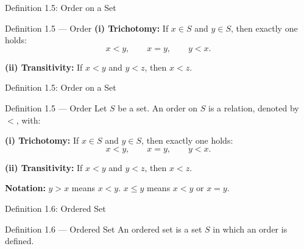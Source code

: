 \documentclass[aspectratio=169,12pt,t]{beamer}
\begin{document}
{\begin{frame}{Definition 1.5: Order on a Set}
\begin{defblock}{Definition 1.5 --- Order}
    \vspace{0.3em}
    \textbf{(i) Trichotomy:} If $x \in S$ and $y \in S$, then exactly one holds:
    \[
      x < y, \qquad x = y, \qquad y < x.
    \]

    \textbf{(ii) Transitivity:} If $x < y$ and $y < z$, then $x < z$.
  \end{defblock}

\end{frame}

\begin{frame}{Definition 1.5: Order on a Set}
  \begin{defblock}{Definition 1.5 --- Order}
    Let $S$ be a set. An \alert{order} on $S$ is a relation, denoted by $<$, with:

    \vspace{0.3em}
    \textbf{(i) Trichotomy:} If $x \in S$ and $y \in S$, then exactly one holds:
    \[
      x < y, \qquad x = y, \qquad y < x.
    \]

    \textbf{(ii) Transitivity:} If $x < y$ and $y < z$, then $x < z$.
  \end{defblock}

  \vspace{0.5em}
  \begin{hlbox}
    \textbf{Notation:} $y > x$ means $x < y$. \quad $x \leq y$ means $x < y$ or $x = y$.
  \end{hlbox}

\end{frame}

\begin{frame}{Definition 1.6: Ordered Set}
  \begin{defblock}{Definition 1.6 --- Ordered Set}
    An \alert{ordered set} is a set $S$ in which an order is defined.
  \end{defblock}


\end{frame}}
\end{document}
